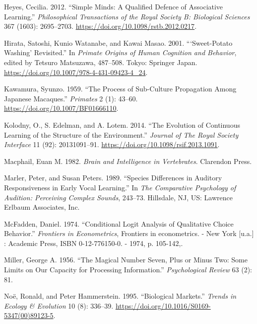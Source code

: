 \documentclass[
  12pt,
]{article}
\newlength{\cslhangindent}
\newlength{\cslentryspacingunit} %
\newenvironment{CSLReferences}[2] %
 {%
  \setlength{\parindent}{0pt}
  \ifodd #1
  \let\oldpar\par
  \def\par{\hangindent=\cslhangindent\oldpar}
  \fi
  \setlength{\parskip}{#2\cslentryspacingunit}
 }%
 {}
\begin{document}
\begin{CSLReferences}{1}{0}
\leavevmode{}%
Heyes, Cecilia. 2012. {``Simple Minds: A Qualified Defence of
Associative Learning.''} \emph{Philosophical Transactions of the Royal
Society B: Biological Sciences} 367 (1603): 2695--2703.
\url{https://doi.org/10.1098/rstb.2012.0217}.

\leavevmode{}%
Hirata, Satoshi, Kunio Watanabe, and Kawai Masao. 2001.
{``{`{Sweet}-{Potato} {Washing}'} {Revisited}.''} In \emph{Primate
{Origins} of {Human} {Cognition} and {Behavior}}, edited by Tetsuro
Matsuzawa, 487--508. Tokyo: Springer Japan.
\url{https://doi.org/10.1007/978-4-431-09423-4_24}.

\leavevmode{}%
Kawamura, Syunzo. 1959. {``The Process of Sub-Culture Propagation Among
{Japanese} Macaques.''} \emph{Primates} 2 (1): 43--60.
\url{https://doi.org/10.1007/BF01666110}.

\leavevmode{}%
Kolodny, O., S. Edelman, and A. Lotem. 2014. {``The Evolution of
Continuous Learning of the Structure of the Environment.''}
\emph{Journal of The Royal Society Interface} 11 (92): 20131091--91.
\url{https://doi.org/10.1098/rsif.2013.1091}.

\leavevmode{}%
Macphail, Euan M. 1982. \emph{Brain and {Intelligence} in
{Vertebrates}}. Clarendon Press.

\leavevmode{}%
Marler, Peter, and Susan Peters. 1989. {``Species Differences in
Auditory Responsiveness in Early Vocal Learning.''} In \emph{The
Comparative Psychology of Audition: {Perceiving} Complex Sounds},
243--73. Hillsdale, NJ, US: Lawrence Erlbaum Associates, Inc.

\leavevmode{}%
McFadden, Daniel. 1974. {``Conditional Logit Analysis of Qualitative
Choice Behavior.''} \emph{Frontiers in Econometrics}, Frontiers in
econometrics. - {New} {York} {[}u.a.{]} : {Academic} {Press}, {ISBN}
0-12-776150-0. - 1974, p. 105-142,.

\leavevmode{}%
Miller, George A. 1956. {``The Magical Number Seven, Plus or Minus Two:
{Some} Limits on Our Capacity for Processing Information.''}
\emph{Psychological Review} 63 (2): 81.

\leavevmode{}%
Noë, Ronald, and Peter Hammerstein. 1995. {``Biological Markets.''}
\emph{Trends in Ecology \& Evolution} 10 (8): 336--39.
\url{https://doi.org/10.1016/S0169-5347(00)89123-5}.


\end{CSLReferences}
\end{document}
